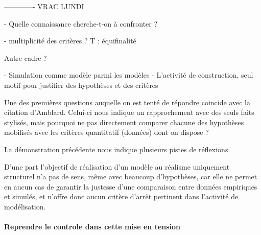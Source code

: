 























------------- VRAC LUNDI







- Quelle connaissance cherche-t-on à confronter ?

	- multiplicité des critères ?
	T : équifinalité


Autre cadre ?

- Simulation comme modèle parmi les modèles
- L'activité de construction, seul motif pour justifier des hypothèses et des critères

 Une des premières questions auquelle on est tenté de répondre coincide avec la citation d'Amblard. Celui-ci nous indique un rapprochement avec des seuls faits stylisés, mais pourquoi ne pas directement comparer chacune des hypothèses mobilisés avec les critères quantitatif (données) dont on dispose ? 







La démonstration précédente nous indique plusieurs pistes de réflexions.

D'une part l'objectif de réalisation d'un modèle au réalisme uniquement structurel n'a pas de sens, même avec beaucoup d'hypothèses, car elle ne permet en aucun cas de garantir la justesse d'une comparaison entre données empiriques et simulés, et n'offre donc aucun critère d'arrêt pertinent dans l'activité de modélisation.






 


\paragraph{Reprendre le controle dans cette mise en tension}
\label{p:critere_evaluation}

